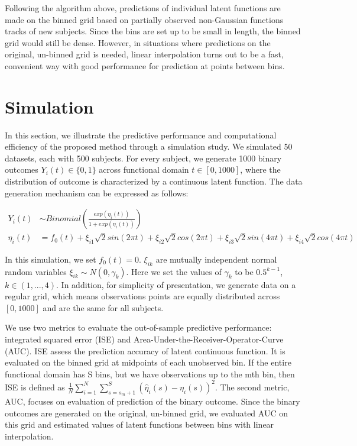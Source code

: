 \documentclass[
  11pt,
]{article}
\begin{document}
Following the algorithm above, predictions of individual latent
functions are made on the binned grid based on partially observed
non-Gaussian functions tracks of new subjects. Since the bins are set up
to be small in length, the binned grid would still be dense. However, in
situations where predictions on the original, un-binned grid is needed,
linear interpolation turns out to be a fast, convenient way with good
performance for prediction at points between bins.

\hypertarget{simulation}{%
\section{Simulation}\label{simulation}}

In this section, we illustrate the predictive performance and
computational efficiency of the proposed method through a simulation
study. We simulated 50 datasets, each with 500 subjects. For every
subject, we generate 1000 binary outcomes \(Y_i(t) \in \{0, 1\}\) across
functional domain \(t \in [0, 1000]\), where the distribution of outcome
is characterized by a continuous latent function. The data generation
mechanism can be expressed as follows:

\[\begin{aligned}
Y_i(t) & \sim Binomial(\frac{exp(\eta_i(t))}{1+exp(\eta_i(t))}) \\
\eta_i(t) &= f_0(t)+ \xi_{i1}\sqrt{2}sin(2\pi t)+\xi_{i2}\sqrt{2}cos(2\pi t)+\xi_{i3}\sqrt{2}sin(4\pi t)+\xi_{i4}\sqrt{2}cos(4\pi t)
\end{aligned}\]

In this simulation, we set \(f_0(t) = 0\). \(\xi_{ik}\) are mutually
independent normal random variables \(\xi_{ik}\sim N(0, \gamma_k)\).
Here we set the values of \(\gamma_k\) to be \(0.5^{k-1}\),
\(k \in (1,..., 4)\). In addition, for simplicity of presentation, we
generate data on a regular grid, which means observations points are
equally distributed across \([0, 1000]\) and are the same for all
subjects.

We use two metrics to evaluate the out-of-sample predictive performance:
integrated squared error (ISE) and
Area-Under-the-Receiver-Operator-Curve (AUC). ISE assess the prediction
accuracy of latent continuous function. It is evaluated on the binned
grid at midpoints of each unobserved bin. If the entire functional
domain has S bins, but we have observations up to the mth bin, then ISE
is defined as
\(\frac{1}{N}\sum_{i=1}^N\sum_{s=s_m+1}^S(\hat{\eta}_i(s)-\eta_i(s))^2\).
The second metric, AUC, focuses on evaluation of prediction of the
binary outcome. Since the binary outcomes are generated on the original,
un-binned grid, we evaluated AUC on this grid and estimated values of
latent functions between bins with linear interpolation.
\end{document}
